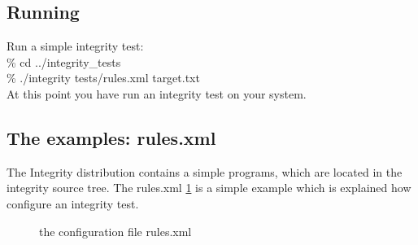 \documentclass[a4paper,10pt]{article}
\begin{document}
\subsection{Running}
Run a simple integrity test:\\
\% cd ../integrity\_tests\\
\% ./integrity tests/rules.xml target.txt\\
At this point you have run an integrity test on your system. 
\subsection{The examples: rules.xml}
The Integrity distribution contains a simple programs, which are located in the
integrity source tree.
The rules.xml \ref{fig:fig1} is a simple example which is explained how configure an integrity test.
\begin{figure}
\label{fig:fig1}


\caption{the configuration file rules.xml}
\end{figure}
\end{document}
